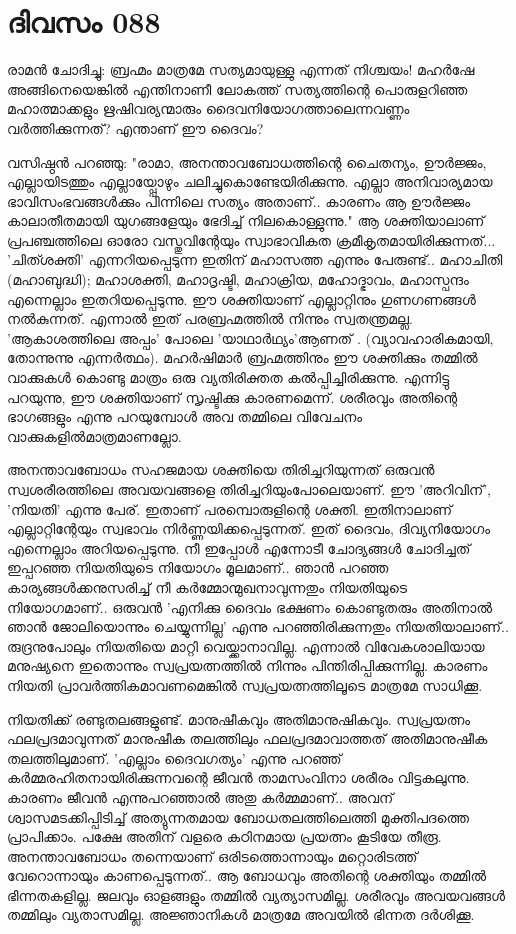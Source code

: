 \newpage
\section{ദിവസം 088}


രാമന്‍ ചോദിച്ചു: ബ്രഹ്മം മാത്രമേ സത്യമായുള്ളു എന്നത്‌ നിശ്ചയം! മഹര്‍ഷേ അങ്ങിനെയെങ്കില്‍ എന്തിനാണീ ലോകത്ത്‌ സത്യത്തിന്റെ പൊരുളറിഞ്ഞ മഹാത്മാക്കളും ഋഷിവര്യന്മാരും ദൈവനിയോഗത്താലെന്നവണ്ണം വര്‍ത്തിക്കുന്നത്‌? എന്താണ്‌ ഈ ദൈവം?

വസിഷ്ഠന്‍ പറഞ്ഞു: "രാമാ, അനന്താവബോധത്തിന്റെ ചൈതന്യം, ഊര്‍ജ്ജം, എല്ലായിടത്തും എല്ലായ്പ്പോഴും ചലിച്ചുകൊണ്ടേയിരിക്കുന്നു. എല്ലാ അനിവാര്യമായ ഭാവിസംഭവങ്ങള്‍ക്കും പിന്നിലെ സത്യം അതാണ്‌.. കാരണം ആ ഊര്‍ജ്ജം കാലാതീതമായി യുഗങ്ങളേയും ഭേദിച്ച്‌ നിലകൊള്ളുന്നു." ആ ശക്തിയാലാണ്‌ പ്രപഞ്ചത്തിലെ ഓരോ വസ്തുവിന്റേയും സ്വാഭാവികത ക്രമീകൃതമായിരിക്കുന്നത്‌... 'ചിത്ശക്തി' എന്നറിയപ്പെടുന്ന ഇതിന്‌ മഹാസത്ത എന്നും പേരുണ്ട്‌.. മഹാചിതി (മഹാബുദ്ധി); മഹാശക്തി, മഹാദൃഷ്ടി, മഹാക്രിയ, മഹോദ്ഭാവം, മഹാസ്പന്ദം എന്നെല്ലാം ഇതറിയപ്പെടുന്നു. ഈ ശക്തിയാണ്‌ എല്ലാറ്റിനും ഗുണഗണങ്ങള്‍ നല്‍കുന്നത്‌. എന്നാല്‍ ഇത്‌ പരബ്രഹ്മത്തില്‍ നിന്നും സ്വതന്ത്രമല്ല. 'ആകാശത്തിലെ അപ്പം' പോലെ 'യാഥാര്‍ഥ്യം'ആണത്‌ . (വ്യാവഹാരികമായി, തോന്നുന്നു എന്നര്‍ത്ഥം). മഹര്‍ഷിമാര്‍ ബ്രഹ്മത്തിനും ഈ ശക്തിക്കും തമ്മില്‍ വാക്കുകള്‍ കൊണ്ടു മാത്രം ഒരു വ്യതിരിക്തത കല്‍പ്പിച്ചിരിക്കുന്നു. എന്നിട്ടു പറയുന്നു, ഈ ശക്തിയാണ്‌ സൃഷ്ടിക്കു കാരണമെന്ന്. ശരീരവും അതിന്റെ ഭാഗങ്ങളും എന്നു പറയുമ്പോള്‍ അവ തമ്മിലെ വിവേചനം വാക്കുകളില്‍മാത്രമാണല്ലോ. 

അനന്താവബോധം സഹജമായ ശക്തിയെ തിരിച്ചറിയുന്നത്‌ ഒരുവന്‍ സ്വശരീരത്തിലെ അവയവങ്ങളെ തിരിച്ചറിയുംപോലെയാണ്‌. ഈ 'അറിവിന്‌', 'നിയതി' എന്നു പേര്‌. ഇതാണ്‌ പരമ്പൊരുളിന്റെ ശക്തി. ഇതിനാലാണ്‌ എല്ലാറ്റിന്റേയും സ്വഭാവം നിര്‍ണ്ണയിക്കപ്പെടുന്നത്‌. ഇത്‌ ദൈവം, ദിവ്യനിയോഗം എന്നെല്ലാം അറിയപ്പെടുന്നു. നീ ഇപ്പോള്‍ എന്നോടീ ചോദ്യങ്ങള്‍ ചോദിച്ചത്‌ ഇപ്പറഞ്ഞ നിയതിയുടെ നിയോഗം മൂലമാണ്‌.. ഞാന്‍ പറഞ്ഞ കാര്യങ്ങള്‍ക്കനുസരിച്ച്‌ നീ കര്‍മ്മോന്മുഖനാവുന്നതും നിയതിയുടെ നിയോഗമാണ്‌.. ഒരുവന്‍ 'എനിക്കു ദൈവം ഭക്ഷണം കൊണ്ടുതരും അതിനാല്‍ ഞാന്‍ ജോലിയൊന്നും ചെയ്യുന്നില്ല' എന്നു പറഞ്ഞിരിക്കുന്നതും നിയതിയാലാണ്‌.. രുദ്രനുപോലും നിയതിയെ മാറ്റി വെയ്ക്കാനാവില്ല. എന്നാല്‍ വിവേകശാലിയായ മനുഷ്യനെ ഇതൊന്നും സ്വപ്രയത്നത്തില്‍ നിന്നും പിന്തിരിപ്പിക്കുന്നില്ല. കാരണം നിയതി പ്രാവര്‍ത്തികമാവണമെങ്കില്‍ സ്വപ്രയത്നത്തിലൂടെ മാത്രമേ സാധിക്കൂ. 

നിയതിക്ക്‌ രണ്ടുതലങ്ങളുണ്ട്‌. മാനുഷീകവും അതിമാനുഷികവും. സ്വപ്രയത്നം ഫലപ്രദമാവുന്നത്‌ മാനുഷീക തലത്തിലും ഫലപ്രദമാവാത്തത്‌ അതിമാനുഷീക തലത്തിലുമാണ്. 'എല്ലാം ദൈവഗത്യം' എന്നു പറഞ്ഞ്‌ കര്‍മ്മരഹിതനായിരിക്കുന്നവന്റെ ജീവന്‍ താമസംവിനാ ശരീരം വിട്ടകലുന്നു. കാരണം ജീവന്‍ എന്നുപറഞ്ഞാല്‍ അതു കര്‍മ്മമാണ്‌.. അവന്‌ ശ്വാസമടക്കിപ്പിടിച്ച്‌ അത്യുന്നതമായ ബോധതലത്തിലെത്തി മുക്തിപദത്തെ പ്രാപിക്കാം. പക്ഷേ അതിന്‌ വളരെ കഠിനമായ പ്രയത്നം കൂടിയേ തീരൂ. അനന്താവബോധം തന്നെയാണ്‌ ഒരിടത്തൊന്നായും മറ്റൊരിടത്ത്‌ വേറൊന്നായും കാണപ്പെടുന്നത്‌.. ആ ബോധവും അതിന്റെ ശക്തിയും തമ്മില്‍ ഭിന്നതകളില്ല. ജലവും ഓളങ്ങളും തമ്മില്‍ വ്യത്യാസമില്ല. ശരീരവും അവയവങ്ങള്‍ തമ്മിലും വ്യതാസമില്ല. അജ്ഞാനികള്‍ മാത്രമേ അവയില്‍ ഭിന്നത ദര്‍ശിക്കൂ. 

